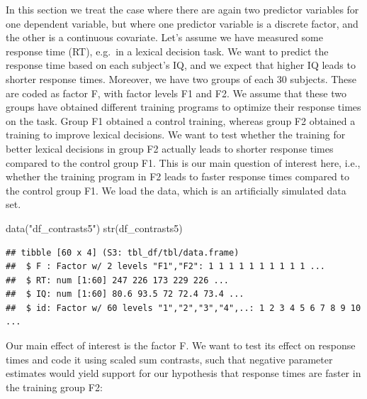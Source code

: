 \documentclass[
  12pt,
]{krantz}
\newenvironment{Shaded}{\begin{snugshade}}{\end{snugshade}}
\newcommand{\FloatTok}[1]{\textcolor[rgb]{0.00,0.00,0.81}{#1}}
\newcommand{\FunctionTok}[1]{\textcolor[rgb]{0.00,0.00,0.00}{#1}}
\newcommand{\NormalTok}[1]{#1}
\newcommand{\OtherTok}[1]{\textcolor[rgb]{0.56,0.35,0.01}{#1}}
\newcommand{\SpecialCharTok}[1]{\textcolor[rgb]{0.00,0.00,0.00}{#1}}
\newcommand{\StringTok}[1]{\textcolor[rgb]{0.31,0.60,0.02}{#1}}
\theoremstyle{definition}
\theoremstyle{definition}
\theoremstyle{definition}
\theoremstyle{definition}
\theoremstyle{remark}
\begin{document}
In this section we treat the case where there are again two predictor variables for one dependent variable, but where one predictor variable is a discrete factor, and the other is a continuous covariate. Let's assume we have measured some response time (RT), e.g.~in a lexical decision task. We want to predict the response time based on each subject's IQ, and we expect that higher IQ leads to shorter response times. Moreover, we have two groups of each 30 subjects. These are coded as factor F, with factor levels F1 and F2. We assume that these two groups have obtained different training programs to optimize their response times on the task. Group F1 obtained a control training, whereas group F2 obtained a training to improve lexical decisions. We want to test whether the training for better lexical decisions in group F2 actually leads to shorter response times compared to the control group F1. This is our main question of interest here, i.e., whether the training program in F2 leads to faster response times compared to the control group F1. We load the data, which is an artificially simulated data set.

\begin{Shaded}
\begin{Highlighting}[]
\FunctionTok{data}\NormalTok{(}\StringTok{"df\_contrasts5"}\NormalTok{)}
\FunctionTok{str}\NormalTok{(df\_contrasts5)}
\end{Highlighting}
\end{Shaded}

\begin{verbatim}
## tibble [60 x 4] (S3: tbl_df/tbl/data.frame)
##  $ F : Factor w/ 2 levels "F1","F2": 1 1 1 1 1 1 1 1 1 1 ...
##  $ RT: num [1:60] 247 226 173 229 226 ...
##  $ IQ: num [1:60] 80.6 93.5 72 72.4 73.4 ...
##  $ id: Factor w/ 60 levels "1","2","3","4",..: 1 2 3 4 5 6 7 8 9 10 ...
\end{verbatim}

Our main effect of interest is the factor F. We want to test its effect on response times and code it using scaled sum contrasts, such that negative parameter estimates would yield support for our hypothesis that response times are faster in the training group F2:

\begin{Shaded}
\end{Shaded}
\end{document}
